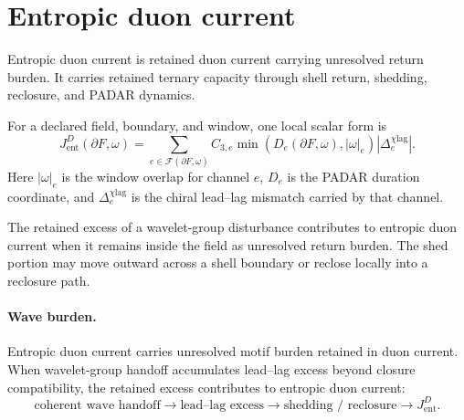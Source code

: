 \section{Entropic duon current}\label{sec:entropic-duon-current}

\begin{definition}
Entropic duon current is retained duon current carrying unresolved return burden. It carries retained ternary capacity through shell return, shedding, reclosure, and PADAR dynamics.
\end{definition}

For a declared field, boundary, and window, one local scalar form is
\begin{equation}
J^D_{\mathrm{ent}}(\partial F,\omega)=
\sum_{e\in \mathcal F(\partial F,\omega)}
C_{3,e}
\min\!\left(D_e(\partial F,\omega),|\omega|_e\right)
\left|\Delta^{\chi\mathrm{lag}}_e\right|.
\label{eq:entropic-duon-current}
\end{equation}
Here \(|\omega|_e\) is the window overlap for channel \(e\), \(D_e\) is the PADAR duration coordinate, and \(\Delta^{\chi\mathrm{lag}}_e\) is the chiral lead--lag mismatch carried by that channel.

The retained excess of a wavelet-group disturbance contributes to entropic duon current when it remains inside the field as unresolved return burden. The shed portion may move outward across a shell boundary or reclose locally into a reclosure path.


\paragraph{Wave burden.}
Entropic duon current carries unresolved motif burden retained in duon current. When wavelet-group handoff accumulates lead--lag excess beyond closure compatibility, the retained excess contributes to entropic duon current:
\[
\text{coherent wave handoff}
\to
\text{lead--lag excess}
\to
\text{shedding / reclosure}
\to
J^D_{\mathrm{ent}}.
\]
